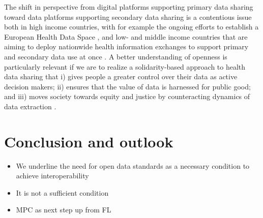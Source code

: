 \documentclass[
  authoryear]{elsarticle}
\providecommand{\tightlist}{%
  \setlength{\itemsep}{0pt}\setlength{\parskip}{0pt}}\usepackage{longtable,booktabs,array}
\begin{document}
The shift in perspective from digital platforms supporting primary data
sharing toward data platforms supporting secondary data sharing is a
contentious issue both in high income countries, with for example the
ongoing efforts to establish a European Health Data Space
\citep{otto2022designing}, and low- and middle income countries that are
aiming to deploy nationwide health information exchanges to support
primary and secondary data use at once \citep{mamuye2022health}. A
better understanding of openness is particularly relevant if we are to
realize a solidarity-based approach to health data sharing that i) gives
people a greater control over their data as active decision makers; ii)
ensures that the value of data is harnessed for public good; and iii)
moves society towards equity and justice by counteracting dynamics of
data extraction
\citep{kickbusch2021lancet, prainsack2022data, prainsack2023beyond}.

\section{Conclusion and outlook}\label{conclusion-and-outlook}

\begin{itemize}
\tightlist
\item
  We underline the need for open data standards as a necessary condition
  to achieve interoperability
\item
  It is not a sufficient condition
\item
  MPC as next step up from FL
\end{itemize}


  
\end{document}
